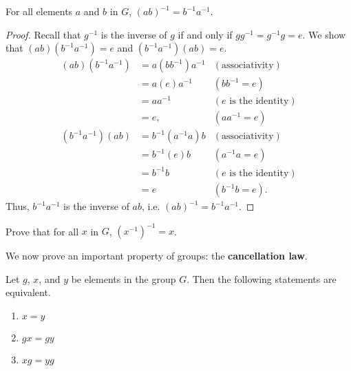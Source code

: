 \begin{theorem}
    For all elements $a$ and $b$ in $G$, $(ab)^{-1} = b^{-1}a^{-1}$.
\end{theorem}
\begin{proof}
    Recall that $g^{-1}$ is the inverse of $g$ if and only if $gg^{-1} = g^{-1}g = e$. We show that $(ab)(b^{-1}a^{-1}) = e$ and $(b^{-1}a^{-1})(ab) = e$.
    \begin{align*}
        (ab)(b^{-1}a^{-1}) &= a(bb^{-1})a^{-1} & (\text{associativity})\\
        &= a(e)a^{-1} & (bb^{-1} = e)\\
        &= aa^{-1} & (e \text{ is the identity})\\
        &= e, & (aa^{-1} = e)\\
        (b^{-1}a^{-1})(ab) &= b^{-1}(a^{-1}a)b & (\text{associativity})\\
        &= b^{-1}(e)b & (a^{-1}a = e)\\
        &= b^{-1}b & (e \text{ is the identity})\\
        &= e & ( b^{-1}b = e).
    \end{align*}
    Thus, $b^{-1}a^{-1}$ is the inverse of $ab$, i.e. $(ab)^{-1} = b^{-1}a^{-1}$.
\end{proof}

\begin{exercise}\label{exercise-inverse-of-inverse-is-element}
Prove that for all $x$ in $G$, $\left(x^{-1}\right)^{-1} = x$.
\end{exercise}

\newpage

We now prove an important property of groups: the \textbf{cancellation law}.
\begin{proposition}
    Let $g$, $x$, and $y$ be elements in the group $G$. Then the following statements are equivalent.
    \begin{enumerate}[label=(\arabic*)]
        \item $x = y$
        \item $gx = gy$
        \item $xg = yg$
    \end{enumerate}
\end{proposition}

